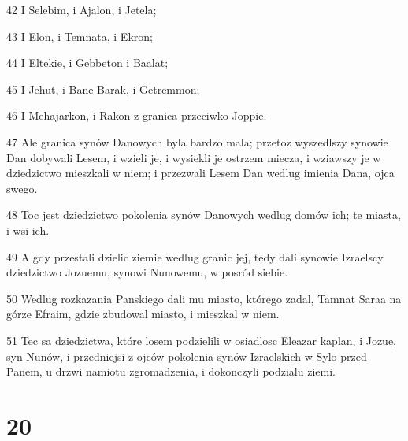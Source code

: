 \par 42 I Selebim, i Ajalon, i Jetela;
\par 43 I Elon, i Temnata, i Ekron;
\par 44 I Eltekie, i Gebbeton i Baalat;
\par 45 I Jehut, i Bane Barak, i Getremmon;
\par 46 I Mehajarkon, i Rakon z granica przeciwko Joppie.
\par 47 Ale granica synów Danowych byla bardzo mala; przetoz wyszedlszy synowie Dan dobywali Lesem, i wzieli je, i wysiekli je ostrzem miecza, i wziawszy je w dziedzictwo mieszkali w niem; i przezwali Lesem Dan wedlug imienia Dana, ojca swego.
\par 48 Toc jest dziedzictwo pokolenia synów Danowych wedlug domów ich; te miasta, i wsi ich.
\par 49 A gdy przestali dzielic ziemie wedlug granic jej, tedy dali synowie Izraelscy dziedzictwo Jozuemu, synowi Nunowemu, w posród siebie.
\par 50 Wedlug rozkazania Panskiego dali mu miasto, którego zadal, Tamnat Saraa na górze Efraim, gdzie zbudowal miasto, i mieszkal w niem.
\par 51 Tec sa dziedzictwa, które losem podzielili w osiadlosc Eleazar kaplan, i Jozue, syn Nunów, i przedniejsi z ojców pokolenia synów Izraelskich w Sylo przed Panem, u drzwi namiotu zgromadzenia, i dokonczyli podzialu ziemi.

\chapter{20}


